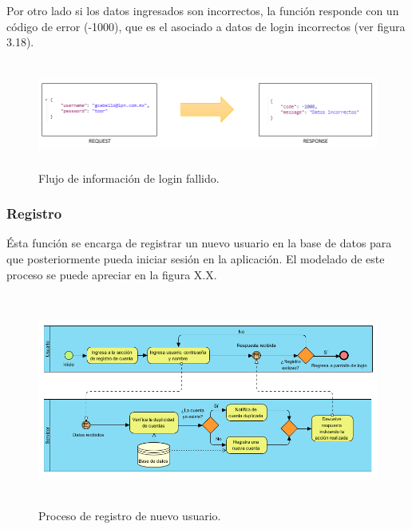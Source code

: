 Por otro lado si los datos ingresados son incorrectos, la función responde con un código de error (-1000), que es el asociado a datos de login incorrectos (ver figura 3.18). 
\begin{figure}[h!]
	\centering
	\includegraphics[width=15cm,height=3.5cm]{imagenes/desarrollo/arquitectura/LOGIN_FAIL.png}
	\caption{Flujo de información de login fallido.}
	\label{fig:loginfail}
\end{figure}

\subsubsection{Registro}
Ésta función se encarga de registrar un nuevo usuario en la base de datos para que posteriormente pueda iniciar sesión en la aplicación. El modelado de este proceso se puede apreciar en la figura X.X. \par
\begin{figure}[h!]
	\centering
	\includegraphics[width=15cm,height=7cm]{imagenes/desarrollo/diagramas/BPMN_REGISTRAR_CUENTA.png}
	\caption{Proceso de registro de nuevo usuario.}
	\label{fig:regsuccess}
\end{figure}


